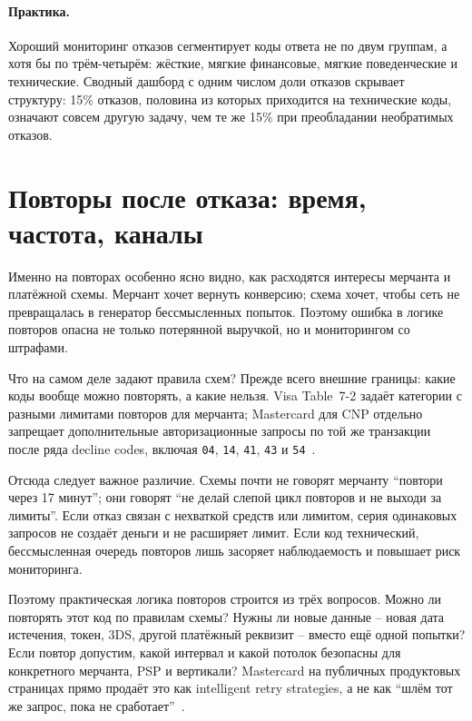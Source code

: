 \paragraph{Практика.}
  Хороший мониторинг отказов сегментирует коды ответа не по двум
  группам, а хотя бы по трём-четырём: жёсткие, мягкие финансовые,
  мягкие поведенческие и технические. Сводный дашборд с одним числом
  доли отказов скрывает структуру: 15\% отказов, половина из которых
  приходится на технические коды, означают совсем другую задачу, чем
  те же 15\% при преобладании необратимых отказов.


\section{Повторы после отказа: время, частота, каналы}
\label{sec:decline-retry}

Именно на повторах особенно ясно видно, как расходятся интересы
мерчанта и платёжной схемы. Мерчант хочет вернуть конверсию; схема
хочет, чтобы сеть не превращалась в генератор бессмысленных попыток.
Поэтому ошибка в логике повторов опасна не только потерянной выручкой,
но и мониторингом со штрафами.

Что на самом деле задают правила схем? Прежде всего внешние границы:
какие коды вообще можно повторять, а какие нельзя. Visa Table~7-2
задаёт категории с разными лимитами повторов для мерчанта; Mastercard для
CNP отдельно запрещает дополнительные авторизационные запросы по той же
транзакции после ряда decline codes, включая \texttt{04}, \texttt{14}, \texttt{41},
\texttt{43} и \texttt{54}~\cite{visa-core-rules}\cite{mc-tpr}.

Отсюда следует важное различие. Схемы почти не говорят мерчанту
\enquote{повтори через 17 минут}; они говорят \enquote{не делай слепой
цикл повторов и не выходи за лимиты}. Если отказ связан с нехваткой
средств или лимитом, серия одинаковых запросов не создаёт деньги и не
расширяет лимит. Если код технический, бессмысленная очередь повторов
лишь засоряет наблюдаемость и повышает риск мониторинга.

Поэтому практическая логика повторов строится из трёх вопросов. Можно
ли повторять этот код по правилам схемы? Нужны ли новые данные -- новая
дата истечения, токен, 3DS, другой платёжный реквизит -- вместо ещё
одной попытки? Если повтор допустим, какой интервал и какой потолок
безопасны для конкретного мерчанта, PSP и вертикали? Mastercard на
публичных продуктовых страницах прямо продаёт это как intelligent retry
strategies, а не как \enquote{шлём тот же запрос, пока не
сработает}~\cite{mc-bill-pay-solutions}.


